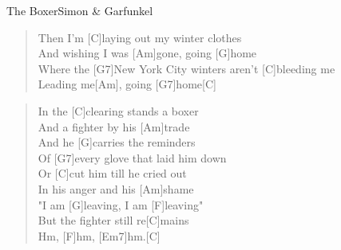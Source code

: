 \begin{song}{The Boxer}{Simon \& Garfunkel}

    \begin{verse}  
        Then I'm [C]laying out my winter clothes \\
        And wishing I was [Am]gone, going [G]home \\
        Where the [G7]New York City winters aren't [C]bleeding me \\
        [Em]Leading me[Am], going [G7]home[C]
    \end{verse}  

    \begin{verse}  
        In the [C]clearing stands a boxer \\
        And a fighter by his [Am]trade \\
        And he [G]carries the reminders \\
        Of [G7]every glove that laid him down \\
        Or [C]cut him till he cried out \\
        In his anger and his [Am]shame \\
        "I am [G]leaving, I am [F]leaving" \\
        But the fighter still re[C]mains \\
        [G]Hm, [F]hm, [Em7]hm.[C]
    \end{verse}  


\end{song}
